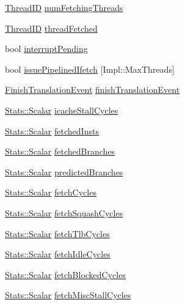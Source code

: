 \begin{DoxyCompactItemize}
\hyperlink{base_2types_8hh_ab39b1a4f9dad884694c7a74ed69e6a6b}{ThreadID} \hyperlink{classDefaultFetch_a6f81783998429ac4a3e8b75a5d5d12d4}{numFetchingThreads}
\item 
\hyperlink{base_2types_8hh_ab39b1a4f9dad884694c7a74ed69e6a6b}{ThreadID} \hyperlink{classDefaultFetch_ac4dd16b14420d21b5704350fbbcefd04}{threadFetched}
\item 
bool \hyperlink{classDefaultFetch_a310de3efc6b60f47de5792d2b00d0840}{interruptPending}
\item 
bool \hyperlink{classDefaultFetch_a4004484fff11512f43124243e7eac71a}{issuePipelinedIfetch} \mbox{[}Impl::MaxThreads\mbox{]}
\item 
\hyperlink{classDefaultFetch_1_1FinishTranslationEvent}{FinishTranslationEvent} \hyperlink{classDefaultFetch_a7bfa632a0dd4f5a541ceb627255286d3}{finishTranslationEvent}
\item 
\hyperlink{classStats_1_1Scalar}{Stats::Scalar} \hyperlink{classDefaultFetch_a2b9328bdb1a6898bfae824981cd64311}{icacheStallCycles}
\item 
\hyperlink{classStats_1_1Scalar}{Stats::Scalar} \hyperlink{classDefaultFetch_af0e3fa228032036d2022ed9e2a3612b6}{fetchedInsts}
\item 
\hyperlink{classStats_1_1Scalar}{Stats::Scalar} \hyperlink{classDefaultFetch_aaca0646636cde96795aed6beb2942975}{fetchedBranches}
\item 
\hyperlink{classStats_1_1Scalar}{Stats::Scalar} \hyperlink{classDefaultFetch_ae5c954036e76b5cc5a82cf7f17d4d5ed}{predictedBranches}
\item 
\hyperlink{classStats_1_1Scalar}{Stats::Scalar} \hyperlink{classDefaultFetch_a9699b5489dd499e832651b96f95b5d19}{fetchCycles}
\item 
\hyperlink{classStats_1_1Scalar}{Stats::Scalar} \hyperlink{classDefaultFetch_ae1b92a3469ac6b00fddd788b71f64c9a}{fetchSquashCycles}
\item 
\hyperlink{classStats_1_1Scalar}{Stats::Scalar} \hyperlink{classDefaultFetch_a9b08d665534d5e7d5b8134c4af16881d}{fetchTlbCycles}
\item 
\hyperlink{classStats_1_1Scalar}{Stats::Scalar} \hyperlink{classDefaultFetch_a8af716ad2a53a409640347226078591c}{fetchIdleCycles}
\item 
\hyperlink{classStats_1_1Scalar}{Stats::Scalar} \hyperlink{classDefaultFetch_a0501ffad4abed98618a6cf0ba9c3599b}{fetchBlockedCycles}
\item 
\hyperlink{classStats_1_1Scalar}{Stats::Scalar} \hyperlink{classDefaultFetch_a0a77b8544fea92003669cdc78a46eea5}{fetchMiscStallCycles}

\end{DoxyCompactItemize}
